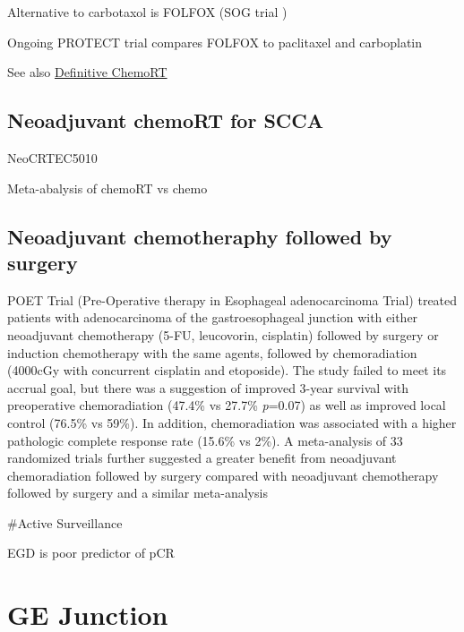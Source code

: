 \documentclass[
]{book}
\begin{document}
Alternative to carbotaxol is FOLFOX (SOG trial \citep{leichman4555})

Ongoing PROTECT trial compares FOLFOX to paclitaxel and carboplatin \citep{messager318}

See also \protect\hyperlink{eso_dcrt}{Definitive ChemoRT}

\hypertarget{neoadjuvant-chemort-for-scca}{%
\subsection{Neoadjuvant chemoRT for SCCA}\label{neoadjuvant-chemort-for-scca}}

NeoCRTEC5010 \citep{yang2796}

Meta-abalysis of chemoRT vs chemo \citep{zhaoe0202185}

\hypertarget{neoadjuvant-chemotheraphy-followed-by-surgery}{%
\subsection{Neoadjuvant chemotheraphy followed by surgery}\label{neoadjuvant-chemotheraphy-followed-by-surgery}}

POET Trial (Pre-Operative therapy in Esophageal adenocarcinoma Trial) treated patients with adenocarcinoma of the gastroesophageal junction with either neoadjuvant chemotherapy (5-FU, leucovorin, cisplatin) followed by surgery or induction chemotherapy with the same agents, followed by chemoradiation (4000cGy with concurrent cisplatin and etoposide). The study failed to meet its accrual goal, but there was a suggestion of improved 3-year survival with preoperative chemoradiation (47.4\% vs 27.7\% \emph{p}=0.07) as well as improved local control (76.5\% vs 59\%). In addition, chemoradiation was associated with a higher pathologic complete response rate (15.6\% vs 2\%)\citep{stahl851}. A meta-analysis of 33 randomized trials further suggested a greater benefit from neoadjuvant chemoradiation followed by surgery compared with neoadjuvant chemotherapy followed by surgery\citep{pasquali481} and a similar meta-analysis \citep{sjoquist681}

\#Active Surveillance

EGD is poor predictor of pCR \citep{sarkaria764}

\hypertarget{ge-junction}{%
\section{GE Junction}\label{ge-junction}}
\end{document}
